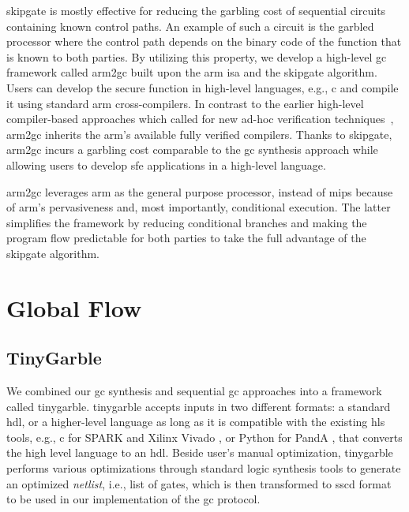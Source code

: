 \gls{skipgate} is mostly effective for reducing the garbling cost of sequential circuits containing known control paths.
An example of such a circuit is the garbled processor where the control path depends on the binary code of the function that is known to both parties.
By utilizing this property, we develop a high-level \acrshort{gc} framework called \gls{arm2gc} built upon the \gls{arm} \acrshort{isa} and the \gls{skipgate} algorithm.
Users can develop the secure function in high-level languages, e.g., \gls{c} and compile it using standard \gls{arm} cross-compilers.
In contrast to the earlier high-level compiler-based approaches which called for new ad-hoc verification techniques~\cite{rastogi2014wysteria,demmler2015aby,liu2015oblivm,mood2016frigate}, \gls{arm2gc} inherits the \gls{arm}'s available fully verified compilers.
Thanks to \gls{skipgate}, \gls{arm2gc} incurs a garbling cost comparable to the \acrshort{gc} synthesis approach while allowing users to develop \acrshort{sfe} applications in a high-level language.

\gls{arm2gc} leverages \gls{arm} as the general purpose processor, instead of \gls{mips} because of \gls{arm}'s pervasiveness and, most importantly, conditional execution.
The latter simplifies the framework by reducing conditional branches and making the program flow predictable for both parties to take the full advantage of the \gls{skipgate} algorithm.

\section{Global Flow}
\subsection{TinyGarble}
We combined our \acrshort{gc} synthesis and sequential \acrshort{gc} approaches into a framework called \gls{tinygarble}.
\gls{tinygarble} accepts inputs in two different formats: a standard \acrfull{hdl}, or a higher-level language as long as it is compatible with the existing \acrfull{hls} tools, e.g., \gls{c} for  SPARK \cite{Gupta2004} and Xilinx Vivado \cite{tool:Vivado}, or Python for PandA \cite{tool:PandA}, that converts the high level language to an \acrshort{hdl}.
Beside user's manual optimization, \gls{tinygarble} performs various optimizations through standard logic synthesis tools to generate an optimized \emph{netlist}, i.e., list of gates, which is then transformed to \acrfull{sscd} format to be used in our implementation of the \acrshort{gc} protocol.

